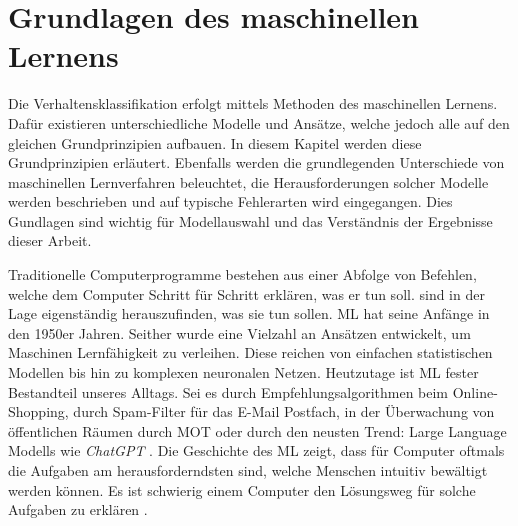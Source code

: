 \section{Grundlagen des maschinellen Lernens} \label{sec:Grundlagen ML}

Die Verhaltensklassifikation erfolgt mittels Methoden des maschinellen Lernens. Dafür existieren unterschiedliche Modelle und Ansätze, welche jedoch alle auf den gleichen Grundprinzipien aufbauen. In diesem Kapitel werden diese Grundprinzipien erläutert. Ebenfalls werden die grundlegenden Unterschiede von maschinellen Lernverfahren beleuchtet, die Herausforderungen solcher Modelle werden beschrieben und auf typische Fehlerarten wird eingegangen. Dies Gundlagen sind wichtig für Modellauswahl und das Verständnis der Ergebnisse dieser Arbeit.

Traditionelle Computerprogramme bestehen aus einer Abfolge von Befehlen, welche dem Computer Schritt für Schritt erklären, was er tun soll.  sind in der Lage eigenständig herauszufinden, was sie tun sollen. \Gls{ML} hat seine Anfänge in den 1950er Jahren. Seither wurde eine Vielzahl an Ansätzen entwickelt, um Maschinen Lernfähigkeit zu verleihen. Diese reichen von einfachen statistischen Modellen bis hin zu komplexen neuronalen Netzen. Heutzutage ist \gls{ML} fester Bestandteil unseres Alltags. Sei es durch Empfehlungsalgorithmen beim Online-Shopping, durch Spam-Filter für das E-Mail Postfach, in der Überwachung von öffentlichen Räumen durch \gls{MOT} oder durch den neusten Trend: Large Language Modells wie \textit{ChatGPT} \cite{Domingos.2015, Liu.2023}. Die Geschichte des \gls{ML} zeigt, dass für Computer oftmals die Aufgaben am herausforderndsten sind, welche Menschen intuitiv bewältigt werden können. Es ist schwierig einem Computer den Lösungsweg für solche Aufgaben zu erklären \cite{Goodfellow.2016}. \par

